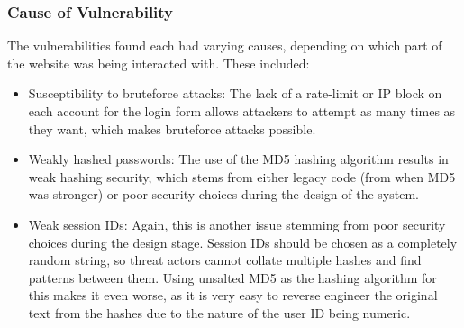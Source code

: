 \documentclass{report}
\begin{document}
\subsubsection{Cause of Vulnerability}
The vulnerabilities found each had varying causes, depending on which part of the website was being interacted with. These included:
\begin{itemize}
	\item Susceptibility to bruteforce attacks: The lack of a rate-limit or IP block on each account for the login form allows attackers to attempt as many times as they want, which makes bruteforce attacks possible. 
	\item Weakly hashed passwords: The use of the MD5 hashing algorithm results in weak hashing security, which stems from either legacy code (from when MD5 was stronger) or poor security choices during the design of the system.
	\item Weak session IDs: Again, this is another issue stemming from poor security choices during the design stage. Session IDs should be chosen as a completely random string, so threat actors cannot collate multiple hashes and find patterns between them. Using unsalted MD5 as the hashing algorithm for this makes it even worse, as it is very easy to reverse engineer the original text from the hashes due to the nature of the user ID being numeric.
\end{itemize}
\end{document}
